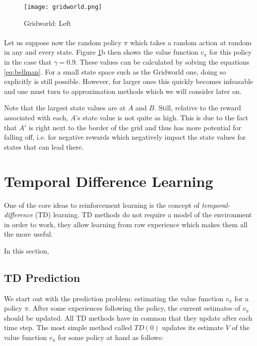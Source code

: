 \begin{figure}[htpb]
  \centering
  \texttt{[image: gridworld.png]}
  \caption{Gridworld: Left }
  \label{fig:gridworld}
\end{figure}

\paragraph{}
Let us suppose now the random policy $\pi$
which takes a random action at random in any and every state.
Figure \ref{fig:gridworld}b then shows the value function $v_\pi$
for this policy in the case that $\gamma=0.9$.
These values can be calculated by solving the equations \ref{eq:bellman}.
For a small state space such as the Gridworld one, doing so explicitly
is still possible.
However, for larger ones this quickly becomes infeasable
and one must turn to approximation methods
which we will consider later on.

Note that the largest state values are at $A$ and $B$.
Still, relative to the reward associated with each,
$A$'s state value is not quite as high.
This is due to the fact that $A'$
is right next to the border of the grid
and thus has more potential for falling off,
i.e. for negative rewards which negatively impact
the state values for states that can lead there.

\section{Temporal Difference Learning}

One of the core ideas to reinforcement learning
is the concept of \textit{temporal-difference} (TD) learning.
TD methods do not require a model of the environment
in order to work,
they allow learning from raw experience
which makes them all the more useful.

In this section,

\subsection{TD Prediction}
We start out with the prediction problem:
estimating the value function $v_\pi$ for a policy $\pi$.
After some experiences following the policy,
the current estimates of $v_\pi$ should be updated.
All TD methods have in common that they update after each time step.
The most simple method called $TD(0)$
updates its estimate $V$ of the value function $v_\pi$
for some policy at hand as follows:

